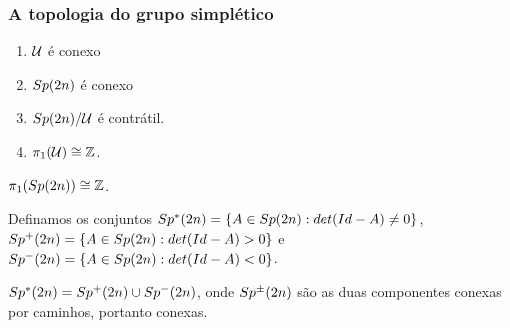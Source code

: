 \documentclass{beamer}
\begin{document}
	\begin{frame}
		\frametitle{A topologia do grupo simplético}
		
		\begin{enumerate}
			\item $\mathcal{U}$ é conexo
			
			\item $Sp(2n)$ é conexo
			
			\item $Sp(2n)/\mathcal{U}$ é contrátil.
			
			\item $\pi_{1}(\mathcal{U}) \cong \mathbb{Z}$.
			
		\end{enumerate}
		
		\begin{teorema}
			$\pi_{1}(Sp(2n)) \cong \mathbb{Z}$.
			
		\end{teorema}
	\end{frame}
	
	\begin{frame}
		Definamos os conjuntos $Sp^{*}(2n) = \{ A \in Sp(2n): det(Id-A)\neq 0 \}$, $Sp^{+}(2n) = \{ A \in Sp(2n): det(Id-A)> 0 \}$ e  $Sp^{-}(2n) = \{ A \in Sp(2n): det(Id-A)< 0 \}$.
		
		\begin{lema}
			$Sp^{*}(2n) = Sp^{+}(2n)\cup Sp^{-}(2n)$, onde $Sp^{\pm}(2n)$ são as duas componentes conexas por caminhos, portanto conexas.
		\end{lema}
		
	\end{frame}
	
\end{document}
